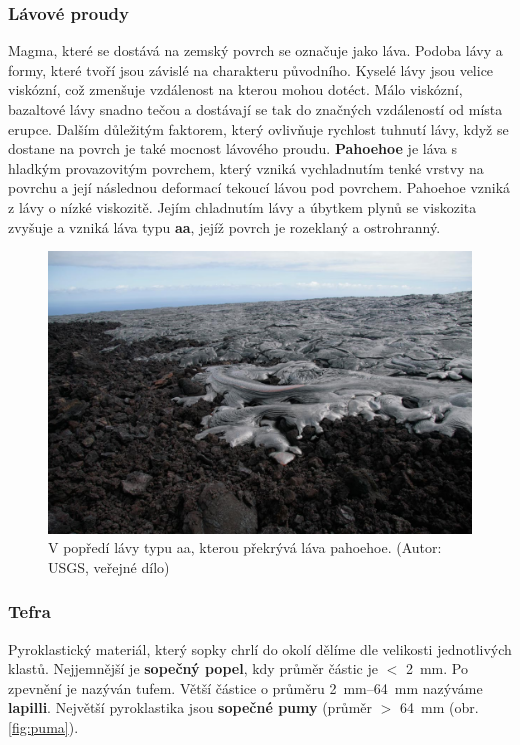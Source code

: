 \subsubsection{Lávové proudy}
Magma, které se dostává na zemský povrch se označuje jako láva. Podoba lávy a formy, které tvoří jsou závislé na charakteru původního. Kyselé lávy jsou velice viskózní, což zmenšuje vzdálenost na kterou mohou dotéct. Málo viskózní, bazaltové lávy snadno tečou a dostávají se tak do značných vzdáleností od místa erupce. Dalším důležitým faktorem, který ovlivňuje rychlost tuhnutí lávy, když se dostane na povrch je také mocnost lávového proudu. 
\textbf{Pahoehoe} je láva s hladkým provazovitým povrchem, který vzniká vychladnutím tenké vrstvy na povrchu a její následnou deformací tekoucí lávou pod povrchem. Pahoehoe vzniká z lávy o nízké viskozitě. Jejím chladnutím lávy a úbytkem plynů se viskozita zvyšuje a vzniká láva typu \textbf{aa}, jejíž povrch je rozeklaný a ostrohranný.

\begin{figure}[h]
	\includegraphics[width=\linewidth]{obrazky/sopky/paho_aa}
	\caption[Pahoehoe]{V popředí lávy typu aa, kterou překrývá láva pahoehoe. (Autor: USGS, veřejné dílo)}
	\label{fig:pahoe_aa}
\end{figure}

\subsubsection{Tefra}
Pyroklastický materiál, který sopky chrlí do okolí dělíme dle velikosti jednotlivých klastů. Nejjemnější je \textbf{sopečný popel}, kdy průměr částic je $<$ \SI{2}{\milli\metre}. Po zpevnění je nazýván tufem. Větší částice o průměru \SIrange{2}{64}{\milli\metre} nazýváme \textbf{lapilli}. Největší pyroklastika jsou \textbf{sopečné pumy} (průměr $>$ \SI{64}{\milli\metre} (obr. \ref{fig:puma}).

